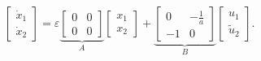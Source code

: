 \documentclass[../main.tex]{subfiles}
\begin{document}
\begin{equation}\label{system5l}
	\left[ {\begin{array}{*{20}{c}}
			{{{\dot x}_1}}\\
			{{{\dot x}_2}}
	\end{array}} \right] = \varepsilon \underbrace {\left[ {\begin{array}{*{20}{c}}
				0&0\\
				0&0
		\end{array}} \right]}_A\left[ {\begin{array}{*{20}{c}}
			{{x_1}}\\
			{{x_2}}
	\end{array}} \right] + \underbrace {\left[ {\begin{array}{*{20}{c}}
				0&-\frac{1}{a}\\
				-1&0
		\end{array}} \right]}_B\left[ \begin{array}{c}
		u_1 \\ 
		\tilde{u}_2
	\end{array} \right].
\end{equation}
\end{document}
